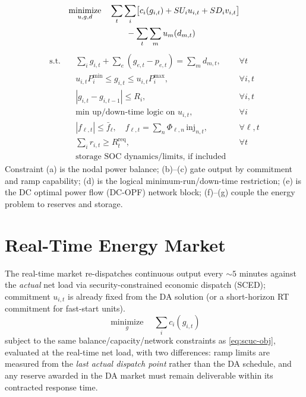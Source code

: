 \documentclass[10pt,conference]{IEEEtran}
\newcommand{\st}{\text{s.t.}}
\newcommand{\minimize}{\operatorname*{minimize}}
\begin{document}
\begin{align}
\minimize_{u,g,d} \quad &
\sum_{t}\sum_{i}\!\big[c_i(g_{i,t}) + SU_i u_{i,t} + SD_i v_{i,t}\big] \notag\\
&\hspace{2em} - \sum_{t}\sum_{m} u_m(d_{m,t}) \label{eq:scuc-obj}
\end{align}
\begin{align*}
\st \quad
&\sum_i g_{i,t} + \sum_e (g_{e,t}-p_{e,t}) = \sum_m d_{m,t}, && \forall t \tag{a}\\
&u_{i,t} P_i^{\min} \le g_{i,t} \le u_{i,t} P_i^{\max}, && \forall i,t \tag{b}\\
&|g_{i,t}-g_{i,t-1}| \le R_i, && \forall i,t \tag{c}\\
&\text{min up/down-time logic on } u_{i,t}, && \forall i \tag{d}\\
&|f_{\ell,t}| \le \bar f_\ell,\quad f_{\ell,t}=\textstyle\sum_n \Phi_{\ell,n}\,\mathrm{inj}_{n,t}, && \forall \ell,t \tag{e}\\
&\textstyle\sum_i r_{i,t} \ge R_t^{\text{req}}, && \forall t \tag{f}\\
&\text{storage SOC dynamics/limits, if included} \tag{g}
\end{align*}
Constraint (a) is the nodal power balance; (b)--(c) gate output by commitment and ramp
capability; (d) is the logical minimum-run/down-time restriction; (e) is the DC optimal
power flow (DC-OPF) network block; (f)--(g) couple the energy problem to reserves and
storage.

\section{Real-Time Energy Market}
The real-time market re-dispatches continuous output every $\sim\!5$ minutes against the
\emph{actual} net load via security-constrained economic dispatch (SCED); commitment
$u_{i,t}$ is already fixed from the DA solution (or a short-horizon RT commitment for
fast-start units).
\begin{equation}
\minimize_{g} \quad \sum_i c_i(g_{i,t})
\end{equation}
subject to the same balance/capacity/network constraints as \eqref{eq:scuc-obj}, evaluated
at the real-time net load, with two differences: ramp limits are measured from the
\emph{last actual dispatch point} rather than the DA schedule, and any reserve awarded in
the DA market must remain deliverable within its contracted response time.
\end{document}
